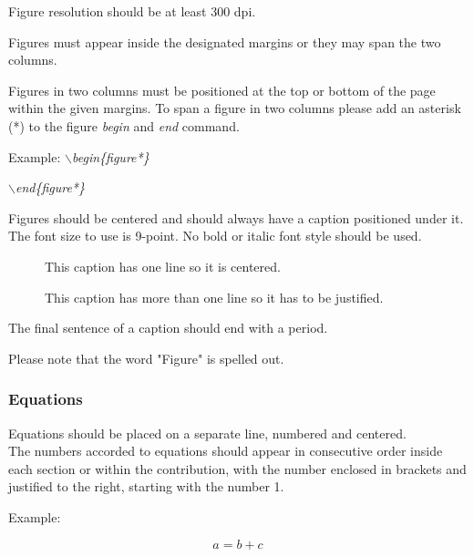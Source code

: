 \documentclass[a4paper,twoside]{article}
\begin{document}
Figure resolution should be at least 300 dpi.

Figures must appear inside the designated margins or they may span
the two columns.

Figures in two columns must be positioned at the top or bottom of
the page within the given margins. To span a figure in two columns please add an asterisk (*) to the figure \textit{begin} and \textit{end} command.

Example: \textit{$\backslash$begin\{figure*\}}

\hspace*{1.5cm}\textit{$\backslash$end\{figure*\}}

Figures should be centered and should always have a caption
positioned under it. The font size to use is 9-point. No bold or
italic font style should be used.

\begin{figure}[!h]
  \centering
   {}
  \caption{This caption has one line so it is centered.}
  \label{fig:example1}
 \end{figure}

\begin{figure}[!h]
  \vspace{-0.2cm}
  \centering
   {}
  \caption{This caption has more than one line so it has to be justified.}
  \label{fig:example2}
\end{figure}

The final sentence of a caption should end with a period.



Please note that the word "Figure" is spelled out.

\subsubsection{Equations}

Equations should be placed on a separate line, numbered and
centered.\\The numbers accorded to equations should appear in
consecutive order inside each section or within the contribution,
with the number enclosed in brackets and justified to the right,
starting with the number 1.

Example:

\begin{equation}\label{eq1}
    a=b+c
\end{equation}
\end{document}
